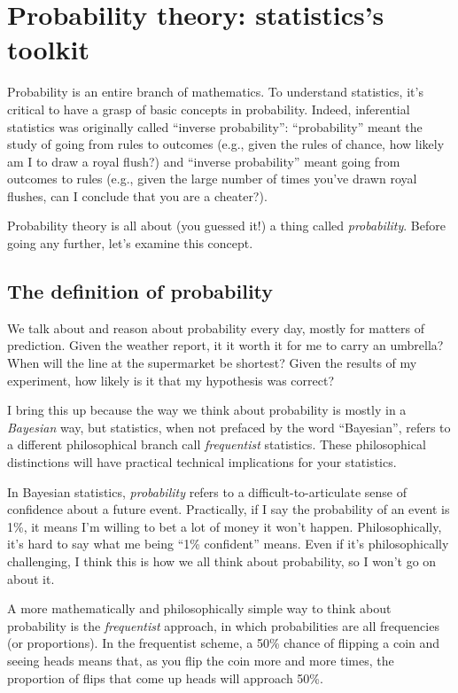 
\chapter{Probability theory: statistics's toolkit}

Probability is an entire branch of mathematics. To understand statistics, it's
critical to have a grasp of basic concepts in probability. Indeed, inferential
statistics was originally called ``inverse probability'': ``probability''
meant the study of going from rules to outcomes (e.g., given the rules of
chance, how likely am I to draw a royal flush?) and ``inverse probability''
meant going from outcomes to rules (e.g., given the large number of times
you've drawn royal flushes, can I conclude that you are a cheater?).

Probability theory is all about (you guessed it!) a thing called
\emph{probability}. Before going any further, let's examine this concept.

\section{The definition of probability}

We talk about and reason about probability every day, mostly for matters of
prediction. Given the weather report, it it worth it for me to carry an
umbrella? When will the line at the supermarket be shortest? Given the results
of my experiment, how likely is it that my hypothesis was correct?

I bring this up because the way we think about probability is mostly in a
\emph{Bayesian} way, but statistics, when not prefaced by the word
``Bayesian'', refers to a different philosophical branch call
\emph{frequentist} statistics. These philosophical distinctions will have
practical technical implications for your statistics.

In Bayesian statistics, \emph{probability} refers to a difficult-to-articulate
sense of confidence about a future event. Practically, if I say the
probability of an event is 1\%, it means I'm willing to bet a lot of money it
won't happen. Philosophically, it's hard to say what me being ``1\%
confident'' means. Even if it's philosophically challenging, I think this is
how we all think about probability, so I won't go on about it.

A more mathematically and philosophically simple way to think about
probability is the \emph{frequentist} approach, in which probabilities are all
frequencies (or proportions). In the frequentist scheme, a 50\% chance of
flipping a coin and seeing heads means that, as you flip the coin more and
more times, the proportion of flips that come up heads will approach 50\%.


